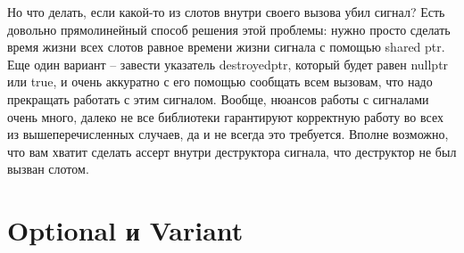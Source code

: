 \documentclass[12pt, a4paper]{article}
\begin{document}
	Но что делать, если какой-то из слотов внутри своего вызова убил сигнал? Есть довольно прямолинейный способ решения этой проблемы: нужно просто сделать время жизни всех слотов равное времени жизни сигнала с помощью shared ptr. Еще один вариант -- завести указатель destroyed\textunderscore ptr, который будет равен nullptr или true, и очень аккуратно с его помощью сообщать всем вызовам, что надо прекращать работать с этим сигналом. Вообще, нюансов работы с сигналами очень много, далеко не все библиотеки гарантируют корректную работу во всех из вышеперечисленных случаев, да и не всегда это требуется. Вполне возможно, что вам хватит сделать ассерт внутри деструктора сигнала, что деструктор не был вызван слотом.
	\section{Optional и Variant}
\end{document}
